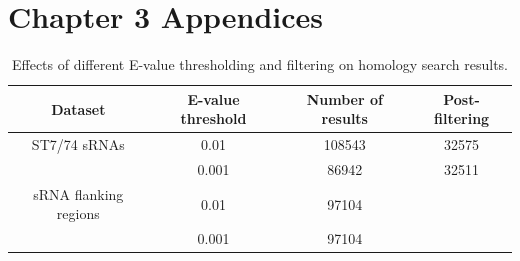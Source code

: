 \chapter{Chapter 3 Appendices}
\begin{table}[H]
    \footnotesize
    \centering
    \begin{tabular}{cccc}\toprule
    Dataset & E-value threshold & Number of results & Post-filtering \\\midrule
ST7/74 sRNAs & 0.01 & 108543 & 32575 \\
& 0.001 & 86942 & 32511 \\
sRNA flanking regions & 0.01 & 97104 \\
& 0.001 & 97104  \\\bottomrule
    \end{tabular}
    \caption[Effects of different E-value thresholding and filtering on homology search results]{Effects of different E-value thresholding and filtering on homology search results.}
    \label{tab:e_value_tests}
\end{table}
